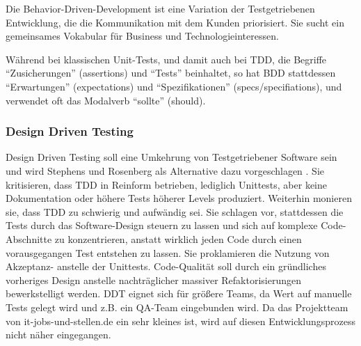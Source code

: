 Die Behavior-Driven-Development ist eine Variation der Testgetriebenen Entwicklung, die die Kommunikation mit dem Kunden priorisiert. Sie sucht ein gemeinsames Vokabular für Business und Technologieinteressen.
  
Während bei klassischen Unit-Tests, und damit auch bei TDD, die Begriffe  "`Zusicherungen"' (assertions) und "`Tests"' beinhaltet, so hat BDD stattdessen "`Erwartungen"' (expectations) und "`Spezifikationen"' (specs/specifiations), und verwendet oft das Modalverb "`sollte"' (should).
  
\subsubsection{Design Driven Testing}
Design Driven Testing soll eine Umkehrung von Testgetriebener Software sein und wird Stephens und Rosenberg als Alternative dazu vorgeschlagen \citep{stephens_design_2010}. Sie kritisieren, dass TDD in Reinform betrieben, lediglich Unittests, aber keine Dokumentation oder höhere Tests höherer Levels produziert. Weiterhin monieren sie, dass TDD zu schwierig und aufwändig sei. Sie schlagen vor, stattdessen die Tests durch das Software-Design steuern zu lassen und sich auf komplexe Code-Abschnitte zu konzentrieren, anstatt wirklich jeden Code durch einen vorausgegangen Test entstehen zu lassen. Sie proklamieren die Nutzung von Akzeptanz- anstelle der Unittests. Code-Qualität soll durch ein gründliches vorheriges Design anstelle nachträglicher massiver Refaktorisierungen bewerkstelligt werden.
DDT eignet sich für größere Teams, da Wert auf manuelle Tests gelegt wird und z.B. ein QA-Team eingebunden wird. Da das Projektteam von it-jobs-und-stellen.de ein sehr kleines ist, wird auf diesen Entwicklungsprozess nicht näher eingegangen.